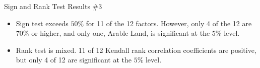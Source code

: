 \documentclass[aspectratio=169]{beamer}
\begin{document}

\begin{frame}{Sign and Rank Test Results \#3}

\begin{itemize}
    \item<1-> Sign test exceeds $ 50\% $ for 11 of the 12 factors.  However, only 4 of the 12 are $ 70\% $ or higher, and only one, Arable Land, is significant at the $ 5\% $ level.
    \item<2-> Rank test is mixed.  11 of 12 Kendall rank correlation coefficients are positive, but only 4 of 12 are significant at the $ 5\% $ level.
\end{itemize}
    
\end{frame}

\end{document}

